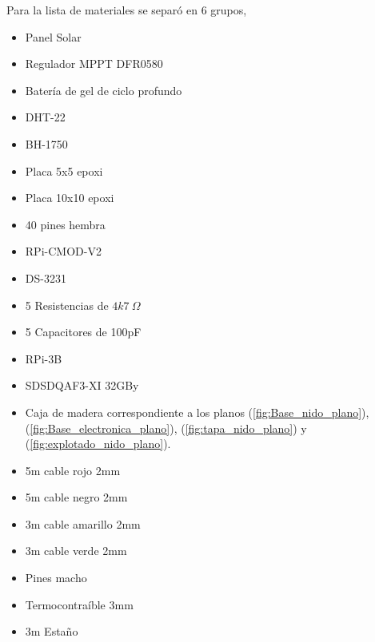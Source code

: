 Para la lista de materiales se separó en 6 grupos, 
\begin{itemize}

\item Panel Solar \TBD
\item Regulador MPPT DFR0580
\item Bater\'ia de gel de ciclo profundo \TBD
\end{itemize}
\begin{itemize}
\item DHT-22 
\item BH-1750
\item Placa 5x5 epoxi
\item Placa 10x10 epoxi
\item 40 pines hembra
\item RPi-CMOD-V2
\item DS-3231
\item 5 Resistencias de $4k7 \ \Omega$ 
\item 5 Capacitores de 100pF
\end{itemize}
\begin{itemize}
\item RPi-3B
\item SDSDQAF3-XI 32GBy
\end{itemize}


\begin{itemize}

\item Caja de madera correspondiente a los planos (\ref{fig:Base_nido_plano}), (\ref{fig:Base_electronica_plano}), (\ref{fig:tapa_nido_plano}) y (\ref{fig:explotado_nido_plano}).


\end{itemize}
\begin{itemize}
\item 5m cable rojo 2mm
\item 5m cable negro 2mm
\item 3m cable amarillo 2mm
\item 3m cable verde 2mm
\item Pines macho
\item Termocontra\'ible 3mm
\item 3m Estaño

\end{itemize}









